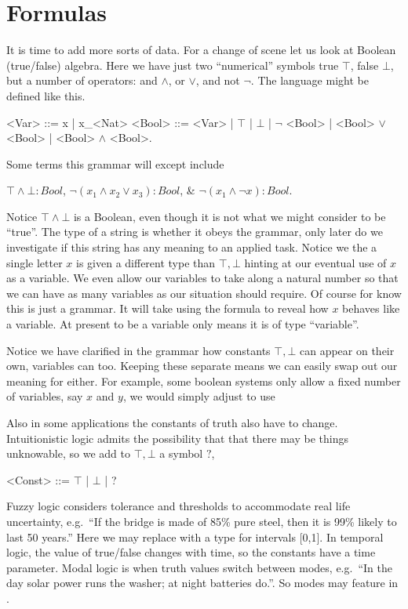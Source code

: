 \section{Formulas}
It is time to add more sorts of data.  For a change of scene let us look 
at Boolean (true/false) algebra.  Here we have just two ``numerical''
symbols true $\top$,
false $\bot$, but a number of operators: and $\wedge$, or $\vee$, and not $\neg$.
The language might be defined
like this.
\begin{Gcode}[]
<Var>  ::= x | x_<Nat>
<Bool> ::= <Var>
        | $\top$
        | $\bot$
        | $\neg$ <Bool> 
        | <Bool> $\vee$ <Bool> 
        | <Bool> $\wedge$ <Bool>.
\end{Gcode}
Some terms this grammar will except include 
\begin{center}
    $\top \wedge \bot :Bool$, 
    $\neg (x_1\wedge x_2\vee x_3):Bool$, \&
    $\neg(x_1\wedge \neg x):Bool$.
\end{center}
Notice $\top\wedge \bot$ is a Boolean, even though it is not what we might 
consider to be ``true''.   The type of a string is whether it obeys the grammar,
only later do we investigate if this string has any meaning to an applied task.
Notice we the a single letter $x$ is given a different type than $\top,\bot$
hinting at our eventual use of $x$ as a variable.  We even allow our variables 
to take along a natural number so that we can have as many variables as our situation 
should require.  Of course for know this is just a grammar.  It will take using 
the formula to reveal how $x$ behaves like a variable.  At present to be 
a variable only means it is of type ``variable''.



Notice we have clarified in the grammar how 
constants $\top,\bot$ can appear on their own, variables can too.  
Keeping these separate means we can easily swap out our meaning for either.
For example, some boolean systems only allow a fixed number of variables, say 
$x$ and $y$, we would simply adjust to use 
\begin{center}
\end{center}
Also in some applications the constants of truth also have to change.
Intuitionistic logic admits the possibility that that there may be 
things unknowable, so we add to $\top,\bot$ a symbol $?$,
\begin{center}
\begin{Gcode}[]
<Const> ::= $\top$ | $\bot$ | ?
\end{Gcode}
\end{center}
Fuzzy logic considers tolerance and thresholds to accommodate real life uncertainty, 
e.g.\ ``If the bridge is made of 85\% pure steel, then it is 99\% likely to last 50 years.''
Here we may replace  with a type for intervals [0,1].
In temporal logic, the value of true/false changes with time, so the 
constants have a time parameter.  Modal logic is when truth values 
switch between modes, e.g.\ ``In the day solar power runs the washer; at night 
batteries do.''.  So modes may feature in .


